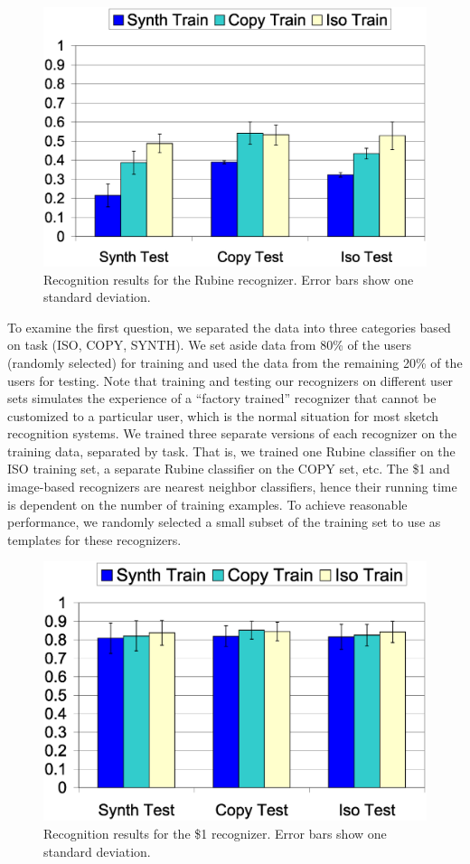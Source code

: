 \documentclass[final,5p,twocolumn]{elsarticle}
\begin{document}
\begin{figure}
\includegraphics[width=1.0\hsize]{rubine_summary.eps}
\caption{Recognition results for the Rubine recognizer. Error bars show one standard deviation.}
\label{rubineGraph}
\end{figure}

To examine the first question, we separated the data into three
categories based on task (ISO, COPY, SYNTH).  We set aside data from
80\% of the users (randomly selected) for training and used the data
from the remaining 20\% of the users for testing.  Note that
training and testing our recognizers on different user sets simulates
the experience of a ``factory trained'' recognizer that cannot be
customized to a particular user, which is the normal situation for
most sketch recognition systems.  We trained three separate versions
of each recognizer on the training data, separated by task.  That is,
we trained one Rubine classifier on the ISO training set, a separate
Rubine classifier on the COPY set, etc.  The \$1 and image-based
recognizers are nearest neighbor classifiers, hence their running time
is dependent on the number of training examples.  To achieve
reasonable performance, we randomly selected a small subset of the
training set to use as templates for these recognizers.

\begin{figure}
\includegraphics[width=1.0\hsize]{dollar_global_summary.eps}
\caption{Recognition results for the \$1 recognizer.  Error bars show one standard deviation.}
\label{dollarGraph}
\end{figure}
\end{document}
